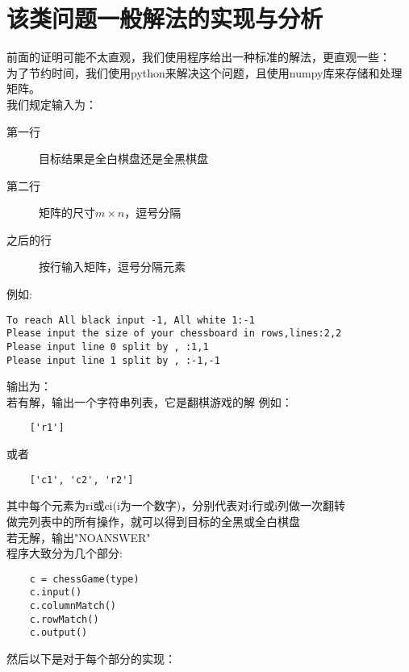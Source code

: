 \documentclass[UTF-8,a4paper]{ctexart}
\begin{document}
\part{该类问题一般解法的实现与分析}
前面的证明可能不太直观，我们使用程序给出一种标准的解法，更直观一些：
\\为了节约时间，我们使用python来解决这个问题，且使用numpy库来存储和处理矩阵。
\\我们规定输入为：
\kaishu
\begin{description}
    \item[第一行]目标结果是全白棋盘还是全黑棋盘 
    \item[第二行]矩阵的尺寸\(m \times n\)，逗号分隔
    \item[之后的行]按行输入矩阵，逗号分隔元素
\end{description}
例如:
\begin{verbatim}
To reach All black input -1, All white 1:-1
Please input the size of your chessboard in rows,lines:2,2
Please input line 0 split by , :1,1
Please input line 1 split by , :-1,-1
\end{verbatim}
\songti
输出为：
\kaishu
\\若有解，输出一个字符串列表，它是翻棋游戏的解
例如：
\begin{verbatim}
    ['r1']
\end{verbatim}
或者
\begin{verbatim}
    ['c1', 'c2', 'r2']
\end{verbatim}
其中每个元素为ri或ci(i为一个数字)，分别代表对i行或i列做一次翻转
\\做完列表中的所有操作，就可以得到目标的全黑或全白棋盘
\\若无解，输出"NOANSWER"
\songti
\\程序大致分为几个部分:
\begin{verbatim}
    c = chessGame(type)
    c.input()
    c.columnMatch()
    c.rowMatch()
    c.output()
\end{verbatim}
然后以下是对于每个部分的实现：
\end{document}
